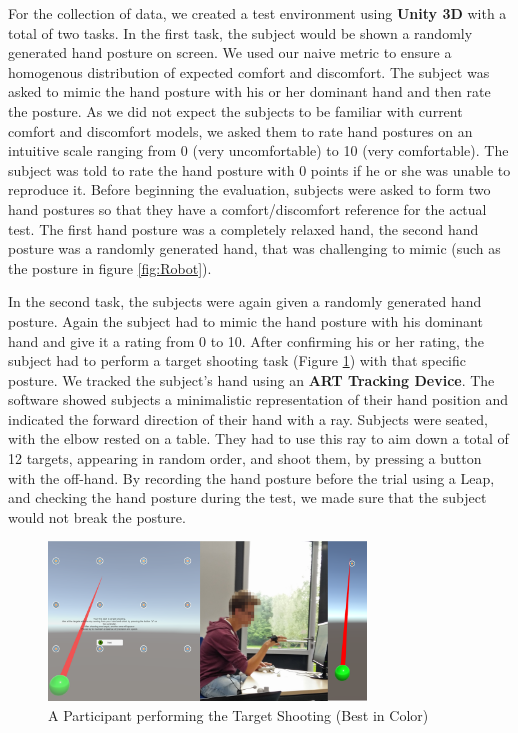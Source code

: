 \documentclass{sig-alternate-05-2015}
\begin{document}
For the collection of data, we created a test environment using \textbf{Unity 3D} with a total of two tasks. In the first task, the subject would be shown a randomly generated hand posture on screen. We used our naive metric to ensure a homogenous distribution of expected comfort and discomfort. The subject was asked to mimic the hand posture with his or her dominant hand and then rate the posture. As we did not expect the subjects to be familiar with current comfort and discomfort models, we asked them to rate hand postures on an intuitive scale ranging from 0 (very uncomfortable) to 10 (very comfortable). The subject was told to rate the hand posture with 0 points if he or she was unable to reproduce it. Before beginning the evaluation, subjects were asked to form two hand postures so that they have a comfort/discomfort reference for the actual test. The first hand posture was a completely relaxed hand, the second hand posture was a randomly generated hand, that was challenging to mimic (such as the posture in figure \ref{fig:Robot}).

In the second task, the subjects were again given a randomly generated hand posture. Again the subject had to mimic the hand posture with his dominant hand and give it a rating from 0 to 10. After confirming his or her rating, the subject had to perform a target shooting task (Figure \ref{fig:participant}) with that specific posture. We tracked the subject's hand using an \textbf{ART Tracking Device}. The software showed subjects a minimalistic representation of their hand position and indicated the forward direction of their hand with a ray. Subjects were seated, with the elbow rested on a table. They had to use this ray to aim down a total of 12 targets, appearing in random order, and shoot them, by pressing a button with the off-hand. By recording the hand posture before the trial using a Leap, and checking the hand posture during the test, we made sure that the subject would not break the posture. 

\begin{figure}[h]
\centering
\includegraphics[width=8.45cm]{Participant}
\vspace{-20pt}
\caption{A Participant performing the Target Shooting (Best in Color)}
\label{fig:participant}
\vspace{-10pt}
\end{figure}
\end{document}
